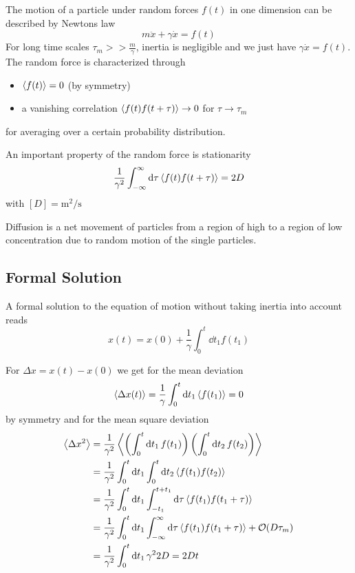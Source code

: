 \documentclass{/home/ben/Templates/notebook}
\begin{document}
	\begin{mdframed}[style=default, frametitle={Model: Random Forces}]
		The motion of a particle under random forces $f(t)$ in one dimension can be described by Newtons law
		\begin{equation}
		m \ddot{x} + \gamma \dot{x} = f(t)
		\end{equation}
		For long time scales $\tau_m >> \frac{m}{\gamma}$, inertia is negligible and we just have $\gamma \dot{x} = f(t)$. The random force is characterized through
		\begin{itemize}
			\item{$\expval{f(t)} = 0$ (by symmetry)}
			\item{a vanishing correlation $\expval{f(t)f(t+\tau)} \to 0$ for $\tau \to \tau_m$}
		\end{itemize}
		for averaging over a certain probability distribution.
	\end{mdframed}
	An important property of the random force is stationarity
	\begin{equation}
	\frac{1}{\gamma^2}\int_{-\infty}^{\infty}{\dd{\tau} \expval{f(t)f(t+\tau)}} = 2D
	\end{equation}
	with $[D] = \si{\meter \squared \per \second}$
	\begin{theorem}
		Diffusion is a net movement of particles from a region of high to a region of low concentration due to random motion of the single particles. 
	\end{theorem}
	
	\subsection*{Formal Solution}
	
	A formal solution to the equation of motion without taking inertia into account reads
	\begin{equation}
	x(t) = x(0) + \frac{1}{\gamma} \int_0^t{\dd{t_1} f(t_1)}
	\end{equation}
	
	For $\Delta x = x(t) - x(0)$ we get for the mean deviation
	\begin{equation}
	\expval{\Delta x(t)} = \frac{1}{\gamma} \int_0^t{\dd{t_1} \expval{f(t_1)}} = 0
	\end{equation}
	by symmetry and for the mean square deviation
	\begin{align*}
		\expval{\Delta x^2} &= \frac{1}{\gamma^2} \expval{\left( \int_0^t{\dd{t_1} f(t_1)} \right) \left( \int_0^t{\dd{t_2} f(t_2)} \right)} \\
		&= \frac{1}{\gamma^2} \int_0^t \dd{t_1} \int_0^t{\dd{t_2} \expval{f(t_1) f(t_2)}} \\
		&= \frac{1}{\gamma^2} \int_0^t \dd{t_1} \int_{-t_1}^{t+t_1}{\dd{\tau} \expval{f(t_1) f(t_1 + \tau)}}\\
		&= \frac{1}{\gamma^2} \int_0^t \dd{t_1} \int_{-\infty}^{\infty}{\dd{\tau} \expval{f(t_1) f(t_1 + \tau)}} + \mathcal{O}(D \tau_m)\\		
		&= \frac{1}{\gamma^2} \int_0^t{\dd{t_1} \gamma^2 2 D} = 2 D t
	\end{align*}
	
\end{document}
